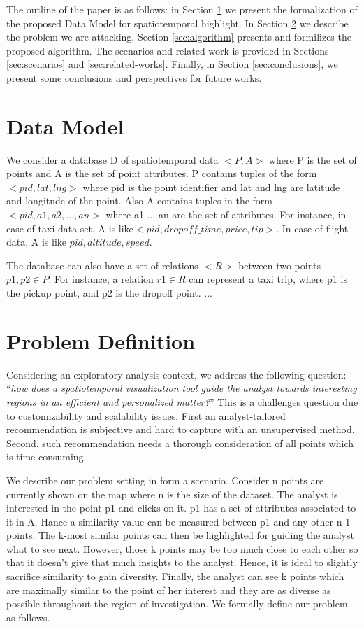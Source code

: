 \documentclass{sig-alternate-05-2015}
\begin{document}
The outline of the paper is as follows: in Section \ref{sec:data-model} we
present the formalization of the proposed Data Model for spatiotemporal
highlight. In Section \ref{sec:problem-definition} we describe the problem we
are attacking. Section \ref{sec:algorithm} presents and formilizes the proposed
algorithm. The scenarios and related work is provided in Sections \ref{sec:scenarios} and
\ref{sec:related-works}. Finally, in Section \ref{sec:conclusions}, we present 
some conclusions and perspectives for future works.

\section{Data Model}\label{sec:data-model}
We consider a database D of spatiotemporal data $<P,A>$ where P is the set of points and A is the set of point attributes. P contains tuples of the form $<pid, lat, lng>$ where pid is the point identifier and lat and lng are latitude and longitude of the point. Also A contains tuples in the form $<pid, a1, a2,..., an>$ where a1 ... 
an are the set of attributes. For instance, in case of taxi data set, A is like$< pid, dropoff\_time, price, tip>$. In case of flight data, A is like $pid, altitude, speed$.

The database can also have a set of relations $<R>$ between two points $p1,p2 \in P$. For instance,  a relation $r1 \in R$ can represent a taxi trip, where p1 is the pickup point, and p2 is the dropoff point. 
...
\section{Problem Definition}\label{sec:problem-definition}

Considering an exploratory analysis context, we address the following question: ``\textit{how does a spatiotemporal visualization tool guide the analyst towards interesting regions in an efficient and personalized matter?}'' This is a challenges question due to customizability and scalability issues. First an analyst-tailored recommendation is subjective and hard to capture with an unsupervised method. Second, such recommendation needs a thorough consideration of all points which is time-consuming.

We describe our problem setting in form a scenario. Consider n points are
currently shown on the map where n is the size of the dataset. The analyst is
interested in the point p1 and clicks on it. p1 has a set of attributes
associated to it in A. Hance a similarity value can be measured between p1 and
any other n-1 points. The k-most similar points can then be highlighted for
guiding the analyst what to see next. However, those k points may be too much
close to each other so that it doesn't give that much insights to the analyst.
Hence, it is ideal to slightly sacrifice similarity to gain diversity. Finally,
the analyst can see k points which are maximally similar to the point of her
interest and they are as diverse as possible throughout the region of
investigation. We formally define our problem as follows.            
\end{document}
